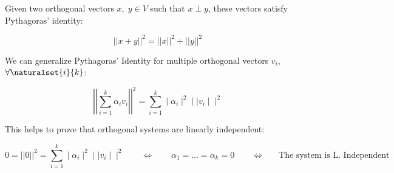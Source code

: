 Given two orthogonal vectors $x,\;y \in V$ such that $x \perp y$, these vectors satisfy Pythagoras' identity:

$$||x+y||^2=||x||^2+||y||^2$$

We can generalize Pythagoras' Identity for multiple orthogonal vectors $v_i$, $\forall \naturalset{i}{k}$:

$$\left\lvert\left\lvert\sum_{i=1}^k\alpha_iv_i\right\rvert\right\rvert^2=\sum_{i=1}^k\mid \alpha_i \mid ^2 \mid \mid v_i \mid \mid ^2$$

This helps to prove that orthogonal systems are linearly independent:

$$0=||0||^2=\sum_{i=1}^k\mid \alpha_i \mid ^2 \mid \mid v_i \mid \mid ^2\text{ }\text{ }\text{ }\Leftrightarrow \text{ }\text{ }\text{ }\alpha_1=...=\alpha_k=0 \text{ }\text{ }\text{ }\Leftrightarrow \text{ }\text{ }\text{ The system is L. Independent}$$